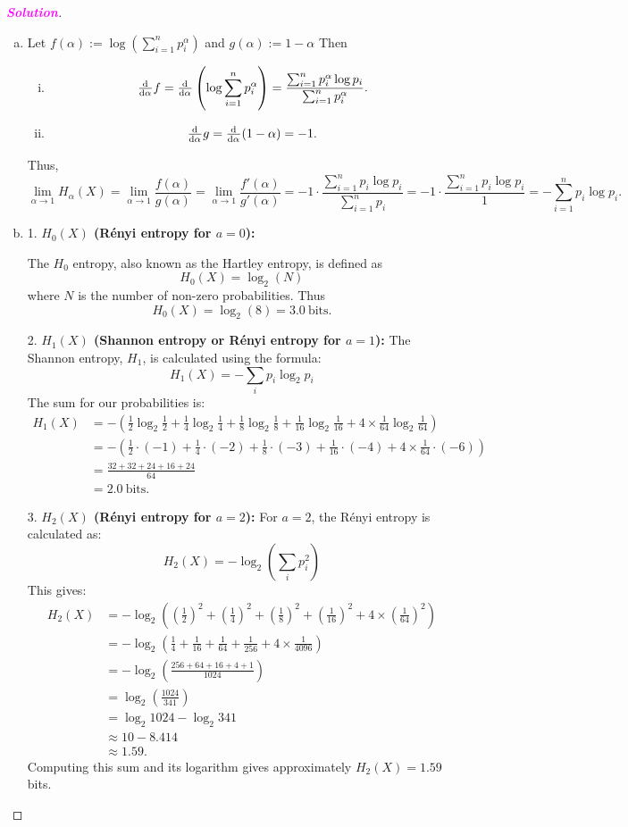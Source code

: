 \documentclass[12pt,openany]{book}
\theoremstyle{definition}
\newcommand{\sol}{\textcolor{magenta}{\bf Solution}}
\newcommand{\of}[1]{\left(#1\right)}
\begin{document}
\begin{proof}[\sol]
	\ \begin{enumerate}[(a)]
		\item Let $f(\alpha):=\log\of{\sum_{i=1}^{n}p_i^\alpha}$ and $g(\alpha):=1-\alpha$ Then \begin{enumerate}[(i)]
			\item \[
			\od{}{\alpha}f=\od{}{\alpha}\of{\log\sum_{i=1}^{n}p_i^\alpha}=\frac{\sum_{i=1}^np_i^\alpha\log p_i}{\sum_{i=1}^np_i^\alpha}.
			\]
			\item \[
			\od{}{\alpha}g=\od{}{\alpha}(1-\alpha)=-1.
			\]
		\end{enumerate} Thus, \[
		\lim\limits_{\alpha\to 1}H_\alpha(X)=
		\lim\limits_{\alpha\to 1}\frac{f(\alpha)}{g(\alpha)}=
		\lim\limits_{\alpha\to 1}\frac{f'(\alpha)}{g'(\alpha)}=
		-1\cdot\frac{\sum_{i=1}^np_i\log p_i}{\sum_{i=1}^np_i}=-1\cdot\frac{\sum_{i=1}^np_i\log p_i}{1}=-\sum_{i=1}^np_i\log p_i.
		\]
		\item 
		1. \textbf{\( H_0(X) \) (Rényi entropy for \( a = 0 \)):}
		
		The \(H_0\) entropy, also known as the Hartley entropy, is defined as
		\[ H_0(X) = \log_2(N) \]
		where \( N \) is the number of non-zero probabilities. Thus \[
		H_0(X) = \log_2(8) = 3.0\ \text{bits.}
		\]
		
		2. \textbf{\( H_1(X) \) (Shannon entropy or Rényi entropy for \( a = 1 \)):}
		The Shannon entropy, \( H_1 \), is calculated using the formula:
		\[ H_1(X) = -\sum_{i} p_i \log_2 p_i \]
		The sum for our probabilities is:
		\begin{align*}
			H_1(X) &= -\left( \frac{1}{2} \log_2 \frac{1}{2} + \frac{1}{4} \log_2 \frac{1}{4} + \frac{1}{8} \log_2 \frac{1}{8} + \frac{1}{16} \log_2 \frac{1}{16} + 4 \times \frac{1}{64} \log_2 \frac{1}{64} \right)&\\
			&=-\of{\frac{1}{2}\cdot(-1)+\frac{1}{4}\cdot(-2)+\frac{1}{8}\cdot(-3)+\frac{1}{16}\cdot(-4)+4\times\frac{1}{64}\cdot(-6)}\\
			&=\frac{32+32+24+16+24}{64}\\
			&=2.0\ \text{bits.}
		\end{align*}
		
		3. \textbf{\( H_2(X) \) (Rényi entropy for \( a = 2 \)):}
		For \( a = 2 \), the Rényi entropy is calculated as:
		\[ H_2(X) = -\log_2 \left( \sum_{i} p_i^2 \right) \]
		This gives:
		\begin{align*}
			H_2(X) &= -\log_2 \left(\of{\frac{1}{2}}^2+\of{\frac{1}{4}}^2+\of{\frac{1}{8}}^2+\of{\frac{1}{16}}^2+4\times\of{\frac{1}{64}}^2\right)\\
			&=-\log_2\left( \frac{1}{4} + \frac{1}{16} + \frac{1}{64} + \frac{1}{256} + 4 \times \frac{1}{4096} \right)\\
			&=-\log_2\of{\frac{256+64+16+4+1}{1024}}\\
			&=\log_2\of{\frac{1024}{341}}\\
			&=\log_2 1024-\log_2 341\\
			&\approx10-8.414\\
			&\approx1.59.
		\end{align*}
		Computing this sum and its logarithm gives approximately \( H_2(X) = 1.59 \) bits.


\end{enumerate}
\end{proof}
\end{document}
